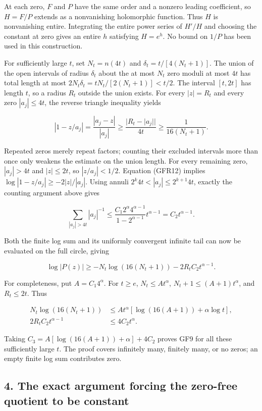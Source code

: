 At each zero, \(F\) and \(P\) have the same order and a nonzero leading coefficient, so \(H=F/P\) extends as a nonvanishing holomorphic function. Thus \(H\) is nonvanishing entire. Integrating the entire power series of \(H'/H\) and choosing the constant at zero gives an entire \(h\) satisfying \(H=e^h\). No bound on \(1/P\) has been used in this construction.

For sufficiently large \(t\), set \(N_t=n(4t)\) and \(\delta_t=t/[4(N_t+1)]\). The union of the open intervals of radius \(\delta_t\) about the at most \(N_t\) zero moduli at most \(4t\) has total length at most \(2N_t\delta_t=tN_t/[2(N_t+1)]<t/2\). The interval \([t,2t]\) has length \(t\), so a radius \(R_t\) outside the union exists. For every \(|z|=R_t\) and every zero \(|a_j|\le4t\), the reverse triangle inequality yields

\[
|1-z/a_j|=\frac{|a_j-z|}{|a_j|}
\ge\frac{|R_t-|a_j||}{4t}
\ge\frac1{16(N_t+1)}.
\tag{GFR13}
\]

Repeated zeros merely repeat factors; counting their excluded intervals more than once only weakens the estimate on the union length. For every remaining zero, \(|a_j|>4t\) and \(|z|\le2t\), so \(|z/a_j|<1/2\). Equation (GFR12) implies \(\log|1-z/a_j|\ge-2|z|/|a_j|\). Using annuli \(2^k4t<|a_j|\le2^{k+1}4t\), exactly the counting argument above gives

\[
\sum_{|a_j|>4t}|a_j|^{-1}
\le\frac{C_1 2^\alpha4^{\alpha-1}}{1-2^{\alpha-1}}t^{\alpha-1}
=C_2t^{\alpha-1}.
\tag{GFR14}
\]

Both the finite log sum and its uniformly convergent infinite tail can now be evaluated on the full circle, giving

\[
\log|P(z)|
\ge-N_t\log(16(N_t+1))-2R_tC_2t^{\alpha-1}.
\tag{GFR15}
\]

For completeness, put \(A=C_1 4^\alpha\). For \(t\ge e\), \(N_t\le At^\alpha\), \(N_t+1\le(A+1)t^\alpha\), and \(R_t\le2t\). Thus

\[
\begin{split}
N_t\log(16(N_t+1))
&\le At^\alpha[\log(16(A+1))+\alpha\log t],\\
2R_tC_2t^{\alpha-1}&\le4C_2t^\alpha.
\end{split}
\]

Taking \(C_3=A[\log(16(A+1))+\alpha]+4C_2\) proves GF9 for all these sufficiently large \(t\). The proof covers infinitely many, finitely many, or no zeros; an empty finite log sum contributes zero.

\subsection{4. The exact argument forcing the zero-free quotient to be constant}\label{C47stage:GFR:the-exact-argument-forcing-the-zero-free-quotient-to-be-constant}

